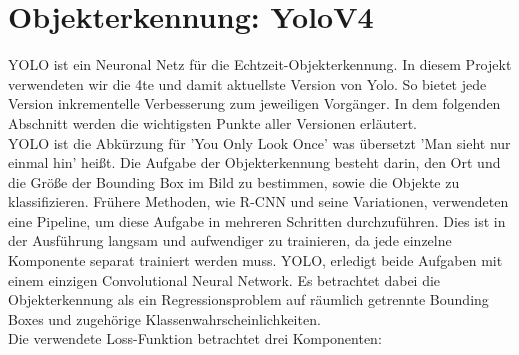 \documentclass[conference]{IEEEtran}
\begin{document}
	\section{Objekterkennung: YoloV4}
	YOLO ist ein Neuronal Netz für die Echtzeit-Objekterkennung. In diesem Projekt verwendeten wir die 4te und damit aktuellste Version von Yolo\cite{b2}. So bietet jede Version inkrementelle Verbesserung zum jeweiligen Vorgänger. In dem folgenden Abschnitt werden die wichtigsten Punkte aller Versionen erläutert.\\
	YOLO ist die Abkürzung für 'You Only Look Once' was übersetzt 'Man sieht nur einmal hin' heißt. Die Aufgabe der Objekterkennung besteht darin, den Ort und die Größe der Bounding Box im Bild zu bestimmen, sowie die Objekte zu klassifizieren. Frühere Methoden, wie R-CNN und seine Variationen, verwendeten eine Pipeline, um diese Aufgabe in mehreren Schritten durchzuführen. Dies ist in der Ausführung langsam und aufwendiger zu trainieren, da jede einzelne Komponente separat trainiert werden muss. YOLO, erledigt beide Aufgaben mit einem einzigen Convolutional Neural Network. Es betrachtet dabei die Objekterkennung als ein Regressionsproblem auf räumlich getrennte Bounding Boxes und zugehörige Klassenwahrscheinlichkeiten.\\
	Die verwendete Loss-Funktion betrachtet drei Komponenten:
\end{document}
